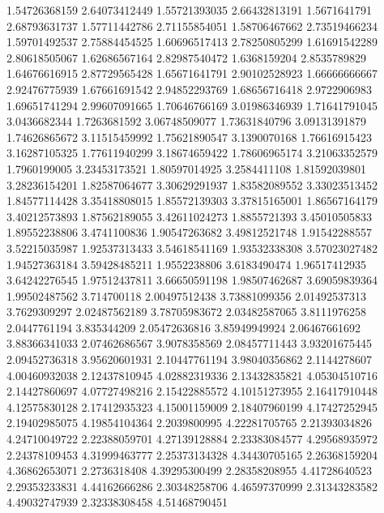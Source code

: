   1.54726368159    2.64073412449
  1.55721393035    2.66432813191
   1.5671641791    2.68793631737
  1.57711442786    2.71155854051
  1.58706467662    2.73519466234
  1.59701492537    2.75884454525
  1.60696517413    2.78250805299
  1.61691542289    2.80618505067
  1.62686567164    2.82987540472
   1.6368159204     2.8535789829
  1.64676616915    2.87729565428
  1.65671641791    2.90102528923
  1.66666666667    2.92476775939
  1.67661691542    2.94852293769
  1.68656716418     2.9722906983
  1.69651741294    2.99607091665
  1.70646766169    3.01986346939
  1.71641791045     3.0436682344
   1.7263681592    3.06748509077
  1.73631840796    3.09131391879
  1.74626865672    3.11515459992
  1.75621890547     3.1390070168
  1.76616915423    3.16287105325
  1.77611940299    3.18674659422
  1.78606965174    3.21063352579
   1.7960199005    3.23453173521
  1.80597014925     3.2584411108
  1.81592039801    3.28236154201
  1.82587064677    3.30629291937
  1.83582089552    3.33023513452
  1.84577114428    3.35418808015
  1.85572139303    3.37815165001
  1.86567164179    3.40212573893
  1.87562189055    3.42611024273
   1.8855721393    3.45010505833
  1.89552238806     3.4741100836
  1.90547263682    3.49812521748
  1.91542288557    3.52215035987
  1.92537313433    3.54618541169
  1.93532338308    3.57023027482
  1.94527363184    3.59428485211
   1.9552238806     3.6183490474
  1.96517412935    3.64242276545
  1.97512437811    3.66650591198
  1.98507462687    3.69059839364
  1.99502487562      3.714700118
  2.00497512438    3.73881099356
  2.01492537313     3.7629309297
  2.02487562189    3.78705983672
  2.03482587065     3.8111976258
   2.0447761194      3.835344209
  2.05472636816    3.85949949924
  2.06467661692    3.88366341033
  2.07462686567     3.9078358569
  2.08457711443    3.93201675445
  2.09452736318    3.95620601931
  2.10447761194    3.98040356862
   2.1144278607    4.00460932038
  2.12437810945    4.02882319336
  2.13432835821    4.05304510716
  2.14427860697    4.07727498216
  2.15422885572    4.10151273955
  2.16417910448    4.12575830128
  2.17412935323    4.15001159009
  2.18407960199    4.17427252945
  2.19402985075    4.19854104364
   2.2039800995    4.22281705765
  2.21393034826    4.24710049722
  2.22388059701    4.27139128884
  2.23383084577    4.29568935972
  2.24378109453    4.31999463777
  2.25373134328    4.34430705165
  2.26368159204    4.36862653071
   2.2736318408    4.39295300499
  2.28358208955    4.41728640523
  2.29353233831    4.44162666286
  2.30348258706    4.46597370999
  2.31343283582    4.49032747939
  2.32338308458    4.51468790451
